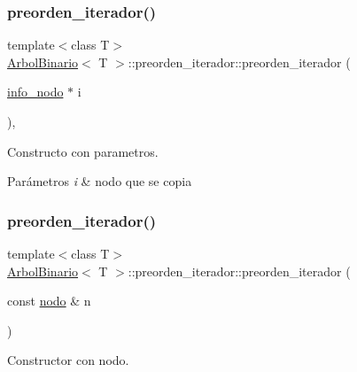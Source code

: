 \subsubsection{\texorpdfstring{preorden\+\_\+iterador()}{preorden\_iterador()}\hspace{0.1cm}{\footnotesize\ttfamily [1/3]}}
{\footnotesize\ttfamily template$<$class T$>$ \\
\hyperlink{classArbolBinario}{Arbol\+Binario}$<$ T $>$\+::preorden\+\_\+iterador\+::preorden\+\_\+iterador (\begin{DoxyParamCaption}\item[{\hyperlink{structArbolBinario_1_1info__nodo}{info\+\_\+nodo} $\ast$}]{i }\end{DoxyParamCaption})\hspace{0.3cm}{\ttfamily [inline]}, {\ttfamily [private]}}



Constructo con parametros. 


\begin{DoxyParams}{Parámetros}
{\em i} & nodo que se copia \\
\hline
\end{DoxyParams}
\mbox{\label{classArbolBinario_1_1preorden__iterador_a1f65086e56a315eea9b1ed0482b42709}} 
\subsubsection{\texorpdfstring{preorden\+\_\+iterador()}{preorden\_iterador()}\hspace{0.1cm}{\footnotesize\ttfamily [2/3]}}
{\footnotesize\ttfamily template$<$class T$>$ \\
\hyperlink{classArbolBinario}{Arbol\+Binario}$<$ T $>$\+::preorden\+\_\+iterador\+::preorden\+\_\+iterador (\begin{DoxyParamCaption}\item[{const \hyperlink{classArbolBinario_1_1nodo}{nodo} \&}]{n }\end{DoxyParamCaption})\hspace{0.3cm}{\ttfamily [inline]}}



Constructor con nodo. 


